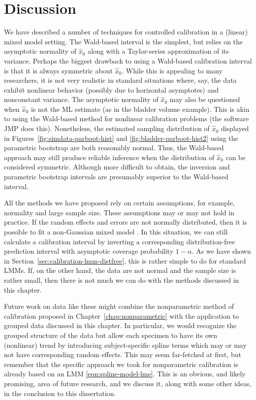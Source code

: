 \documentclass[cmfont,usenames,dvipsnames,leqno]{afit-etd}\usepackage[]{graphicx}\usepackage[]{color}
\newcommand{\wh}[1]{\ensuremath{\widehat{#1}}}
\begin{document}
\section{Discussion}
We have described a number of techniques for controlled calibration in a (linear) mixed model setting. The Wald-based interval is the simplest, but relies on the asymptotic normality of $\wh{x}_0$ along with a Taylor-series approximation of its variance. Perhaps the biggest drawback to using a Wald-based calibration interval is that it is always symmetric about $\wh{x}_0$. While this is appealing to many researchers, it is not very realistic in standard situations where, say, the data exhibit nonlinear behavior (possibly due to horizontal asymptotes) and nonconstant variance. The asymptotic normality of $\wh{x}_0$ may also be questioned when $\wh{x}_0$ is not the \ac{ML} estimate (as in the bladder volume example). This is akin to using the Wald-based method for nonlinear calibration problems (the software JMP does this). Nonetheless, the estimated sampling distribution of $\wh{x}_0$ displayed in Figures~\ref{fig:simdata-parboot-hist} and \ref{fig:bladder-parboot-hist2} using the parametric bootstrap are both reasonably normal. Thus, the Wald-based approach may still produce reliable inference when the distribution of $\wh{x}_0$ can be considered symmetric. Although more difficult to obtain, the inversion and parametric bootstrap  intervals are presumably superior to the Wald-based interval.

All the methods we have proposed rely on certain assumptions, for example, normality and large sample size. These assumptions may or may not hold in practice. If the random effects and errors are not normally distributed, then it is possible to fit a non-Gaussian mixed model \citep[p. 8]{jiang_linear_2007}. In this situation, we can still calculate a calibration interval by inverting a corresponding distribution-free prediction interval with asymptotic coverage probability $1-\alpha$. As we have shown in Section~\ref{sec:calibration-lmm-distfree}, this is rather simple to do for standard LMMs. If, on the other hand, the data are not normal and the sample size is rather small, then there is not much we can do with the methods discussed in this chapter. 

Future work on data like these might combine the nonparametric method of calibration proposed in Chapter~\ref{chap:nonparametric} with the application to grouped data discussed in this chapter. In particular, we would recognize the grouped structure of the data but allow each specimen to have its own (nonlinear) trend by introducing subject-specific spline terms which may or may not have corresponding random effects. This may seem far-fetched at first, but remember that the specific approach we took for nonparametric calibration is already based on an \ac{LMM} \eqref{eqn:spline-model-lme}. This is an obvious, and likely promising, area of future research, and we discuss it, along with some other ideas, in the conclusion to this dissertation.
\end{document}

